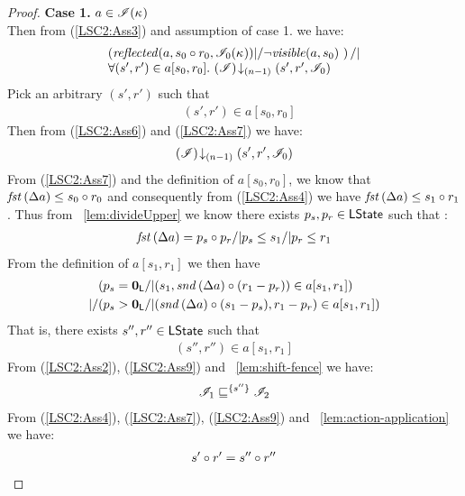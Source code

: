 \begin{lemma}
\begin{proof}
\noindent\textbf{Case 1. } $a \in \mathscr{I}(\kappa_{})$\\
Then from (\ref{LSC2:Ass3}) and assumption of case 1. we have:
%
\begin{align}
	\begin{array}{@{} l @{}}
		\left(\m{reflected}(a, s_0 \composeL r_0, \lmod_0(\ca{})) |/ \neg\m{visible}(a, s_0) \ \right) /| \\
		\for{(s', r') \in a[s_0, r_0]} \extendsAMUpto{\lmod}{(n-1)}{s'}{r'}{\lmod_0}
 	\end{array}
 	\label{LSC2:Ass6}
\end{align}
%
Pick an arbitrary $(s', r')$ such that
%
\begin{align}
	& (s', r') \in a[s_0, r_0] \label{LSC2:Ass7}
\end{align}
Then from (\ref{LSC2:Ass6}) and (\ref{LSC2:Ass7}) we have:
%
\begin{align}
	\left(\mathscr{I}\right) \!\downarrow_{(n-1)} \left(s', r', \mathscr{I}_0\right) \label{LSC2:Ass8}
\end{align}
%
From (\ref{LSC2:Ass7}) and the definition of $a[s_0, r_0]$, we know that $\mathit{fst}\left(\Delta {a}\right) \leq s_0 \circ r_0$ and consequently from (\ref{LSC2:Ass4}) we have $\mathit{fst}\left(\Delta {a}\right) \leq s_1 \circ r_1$. Thus from \lem~\ref{lem:divideUpper} we know there exists $p_s, p_r \in \textsf{LState}$ such that : 
%
\begin{align*}
	\mathit{fst}\left(\Delta {a}\right) = p_s \circ p_r /| p_s \leq s_1 /| p_r \leq r_1
\end{align*}
%
From the definition of $a[s_1, r_1]$ we then have
%
\begin{align*}
	& (p_s = \mathbf{0}_{\textsf{L}} /| (s_1, \mathit{snd}\left(\Delta {a}\right) \circ (r_1 -p_r)) \in a[s_1, r_1])\\
	|/ & (p_s > \mathbf{0}_{\textsf{L}} /| (\mathit{snd}\left(\Delta {a}\right) \circ (s_1 - p_s), r_1 - p_r) \in a[s_1, r_1]) 
\end{align*}
%
That is, there exists $s'', r'' \in \textsf{LState}$ such that
%
\begin{align}
	(s'', r'') \in a[s_1, r_1]
	\label{LSC2:Ass9}
\end{align}
%
From (\ref{LSC2:Ass2}), (\ref{LSC2:Ass9}) and \lem~\ref{lem:shift-fence} we have:
%
\begin{align}
	\mathscr{I}_1 \sqsubseteq^{\{s''\}} \mathscr{I}_2 \label{LSC2:Ass10}
\end{align}
%
From (\ref{LSC2:Ass4}), (\ref{LSC2:Ass7}), (\ref{LSC2:Ass9}) and \lem~\ref{lem:action-application} we have:
%
\begin{align}
	s' \composeL r' = s'' \composeL r'' \label{LSC2:Ass11}

\end{align}
\end{proof}
\end{lemma}
